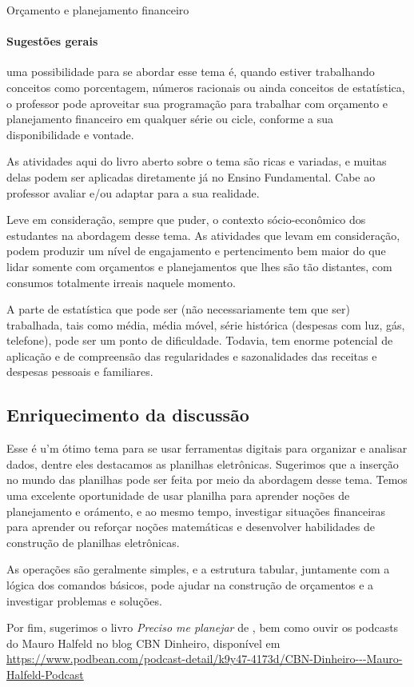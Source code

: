\begin{paginatexto}{Orçamento e planejamento financeiro}
\paragraph{Sugestões gerais} uma possibilidade para se abordar esse tema é, quando estiver trabalhando conceitos como porcentagem, números racionais ou ainda conceitos de estatística, o professor pode aproveitar sua programação para trabalhar com orçamento e planejamento financeiro em qualquer série ou cicle, conforme a sua disponibilidade e vontade.

As atividades aqui do livro aberto sobre o tema são ricas e variadas, e muitas delas podem ser aplicadas diretamente já no Ensino Fundamental. Cabe ao professor avaliar e/ou adaptar para a sua realidade.

Leve em consideração, sempre que puder, o contexto sócio-econômico dos estudantes na abordagem desse tema. As atividades que levam em consideração, podem produzir um nível de engajamento e pertencimento bem maior do que lidar somente com orçamentos e planejamentos que lhes são tão distantes, com consumos totalmente irreais naquele momento.

A parte de estatística que pode ser (não necessariamente tem que ser) trabalhada, tais como média, média móvel, série histórica (despesas com luz, gás, telefone), pode ser um ponto de dificuldade. Todavia, tem enorme potencial de aplicação e de compreensão das regularidades e sazonalidades das receitas e despesas pessoais e familiares.

\subsection*{Enriquecimento da discussão}

Esse é u'm ótimo tema para se usar ferramentas digitais para organizar e analisar dados, dentre eles destacamos as planilhas eletrônicas. Sugerimos que a inserção no mundo das planilhas pode ser feita por meio da abordagem desse tema. Temos uma excelente oportunidade de usar planilha para aprender noções de planejamento e orámento, e ao mesmo tempo, investigar situações financeiras para aprender ou reforçar noções matemáticas e desenvolver habilidades de construção de planilhas eletrônicas.

As operações são geralmente simples, e a estrutura tabular, juntamente com a lógica dos comandos básicos, pode ajudar na construção de orçamentos e a investigar problemas e soluções.

Por fim, sugerimos o livro \textit{Preciso me planejar} de \cite{zentgraf2015}, bem como ouvir os podcasts do Mauro Halfeld no blog CBN Dinheiro, disponível em \url{https://www.podbean.com/podcast-detail/k9y47-4173d/CBN-Dinheiro---Mauro-Halfeld-Podcast}

\end{paginatexto}


